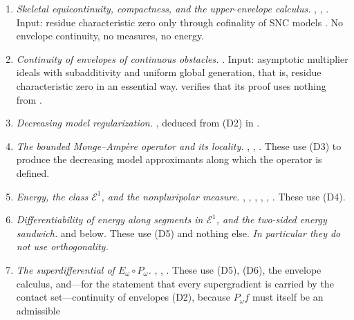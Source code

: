\begin{enumerate}
\item[\textup{(D1)}]
\emph{Skeletal equicontinuity, compactness, and the upper-envelope
calculus.}
, ,
.  Input: residue characteristic zero only
through cofinality of SNC models .  No envelope
continuity, no measures, no energy.
\item[\textup{(D2)}]
\emph{Continuity of envelopes of continuous obstacles.}
.  Input: asymptotic multiplier ideals
with subadditivity and uniform global generation, that is, residue
characteristic zero in an essential way.   verifies
that its proof uses nothing from
.
\item[\textup{(D3)}]
\emph{Decreasing model regularization.}
, deduced from \textup{(D2)} in
.
\item[\textup{(D4)}]
\emph{The bounded Monge--Amp\`ere operator and its locality.}
, ,
.  These use \textup{(D3)} to produce
the decreasing model approximants along which the operator is defined.
\item[\textup{(D5)}]
\emph{Energy, the class \(\mathcal E^1\), and the nonpluripolar measure.}
, ,
, ,
, .  These
use \textup{(D4)}.
\item[\textup{(D6)}]
\emph{Differentiability of energy along segments in \(\mathcal E^1\), and
the two-sided energy sandwich.}
 and
 below.  These use \textup{(D5)} and
nothing else.  \emph{In particular they do not use orthogonality.}
\item[\textup{(D7)}]
\emph{The superdifferential of \(E_\omega\circ P_\omega\).}
, ,
.  These use \textup{(D5)},
\textup{(D6)}, the envelope calculus, and---for the statement that every
supergradient is carried by the contact set---continuity of envelopes
\textup{(D2)}, because \(P_\omega f\) must itself be an admissible

\end{enumerate}
